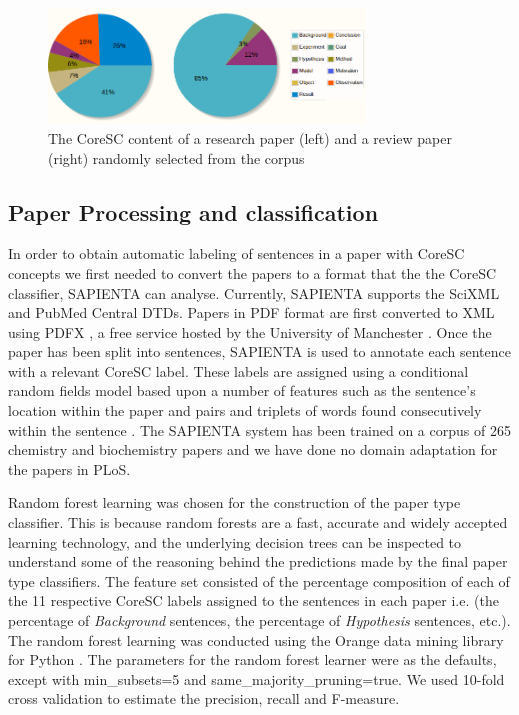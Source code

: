 \documentclass{svmult}
\begin{document}
\begin{figure}[t]
\centering
\includegraphics[width=0.75\textwidth]{figures/corescs.png}
\caption{The CoreSC content of a research paper (left) and a review paper (right) randomly selected from the corpus}
\label{fig:coresc_pies} 
\end{figure}

\subsection*{Paper Processing and classification}

In order to obtain automatic labeling of sentences in a paper with CoreSC
concepts we first needed to convert the papers to a format that the the CoreSC
classifier, SAPIENTA can analyse.  Currently, SAPIENTA supports the SciXML and
PubMed Central DTDs.  Papers in PDF format are first converted to XML using
PDFX , a free service hosted by the University of Manchester
\cite{Constantin2013}. Once the paper has been split into sentences, SAPIENTA
is used to annotate each sentence with a relevant CoreSC label. These labels
are assigned using a conditional random fields model based upon a number of
features such as the sentence's location within the paper and pairs and
triplets of words found consecutively within the sentence \cite{Liakata2012}.
The SAPIENTA system has been trained on a corpus of 265 chemistry and
biochemistry papers and we have done no domain adaptation for the papers in
PLoS.






Random forest learning \cite{Breiman2001} was chosen for the construction of the
paper type classifier. This is because random forests are a fast, accurate and
widely accepted learning technology, and the underlying decision trees can be
inspected to understand some of the reasoning behind the predictions made by
the final paper type classifiers. The feature set consisted of the percentage
composition of each of the 11 respective CoreSC labels assigned to the
sentences in each paper i.e. (the percentage of {\em Background} sentences, the
percentage of {\em Hypothesis} sentences, etc.). The random forest learning was
conducted using the Orange data mining library for Python \cite{Curk2005}.  The
parameters for the random forest learner were as the defaults, except with
min\_subsets=5 and same\_majority\_pruning=true.  We used 10-fold cross
validation to estimate the precision, recall and F-measure.
\end{document}
